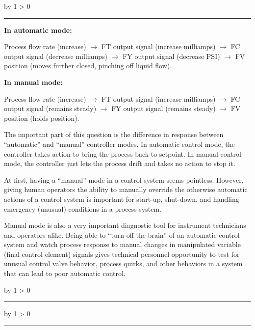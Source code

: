 \documentclass[12pt,a4paper]{article}
\def\oppgave{
            \advance\questnum by 1
            \ifnum \questnum > 0
                 \hrule
                 \vskip 3pt
                 \leftline{Oppgave \the\questnum}
                 \vskip 3pt \fi}
\def\svar{
           \advance\answnum by 1
           \ifnum \answnum > 0
                \hrule
                \vskip 3pt
                \leftline{Svar \the\answnum}
                \vskip 3pt \fi}
\def\notes{
           \advance\explnum by 1
           \ifnum \explnum > 0
                \hrule
                \vskip 3pt
                \leftline{Notes \the\explnum}
                \vskip 3pt \fi}
\begin{document}
\vskip 10pt \filbreak 





\svar{} 

\noindent
{\bf In automatic mode:}

Process flow rate (increase) $\to$ FT output signal (increase milliamps) $\to$ FC output signal (decrease milliamps) $\to$ FY output signal (decrease PSI) $\to$ FV position (moves further closed, pinching off liquid flow).

\vskip 10pt

\noindent
{\bf In manual mode:}

Process flow rate (increase) $\to$ FT output signal (increase milliamps) $\to$ FC output signal (remains steady) $\to$ FY output signal (remains steady) $\to$ FV position (holds position).

\vskip 10pt

The important part of this question is the difference in response between ``automatic'' and ``manual'' controller modes.  In automatic control mode, the controller takes action to bring the process back to setpoint.  In manual control mode, the controller just lets the process drift and takes no action to stop it.

At first, having a ``manual'' mode in a control system seems pointless.  However, giving human operators the ability to manually override the otherwise automatic actions of a control system is important for start-up, shut-down, and handling emergency (unusual) conditions in a process system.  

Manual mode is also a very important diagnostic tool for instrument technicians and operators alike.  Being able to ``turn off the brain'' of an automatic control system and watch process response to manual changes in manipulated variable (final control element) signals gives technical personnel opportunity to test for unusual control valve behavior, process quirks, and other behaviors in a system that can lead to poor automatic control. 


\vskip 10pt \filbreak 





\notes{} 





\vfil \eject 




\oppgave{} 
\end{document}
